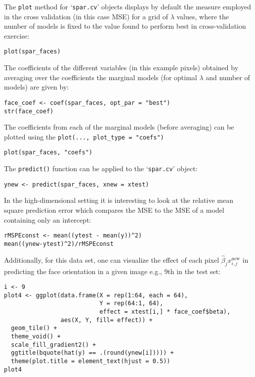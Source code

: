 \documentclass[
  article]{jss}
\begin{document}
The \texttt{plot} method for `\texttt{spar.cv}' objects displays by
default the measure employed in the cross validation (in this case MSE)
for a grid of \(\lambda\) values, where the number of models is fixed to
the value found to perform best in cross-validation exercise:

\begin{verbatim}
plot(spar_faces)
\end{verbatim}

The coefficients of the different variables (in this example pixels)
obtained by averaging over the coefficients the marginal models (for
optimal \(\lambda\) and number of models) are given by:

\begin{verbatim}
face_coef <- coef(spar_faces, opt_par = "best")
str(face_coef)
\end{verbatim}

The coefficients from each of the marginal models (before averaging) can
be plotted using the \texttt{plot(...,\ plot\_type\ =\ "coefs")}

\begin{verbatim}
plot(spar_faces, "coefs")
\end{verbatim}

The \texttt{predict()} function can be applied to the `\texttt{spar.cv}'
object:

\begin{verbatim}
ynew <- predict(spar_faces, xnew = xtest)
\end{verbatim}

In the high-dimensional setting it is interesting to look at the
relative mean square prediction error which compares the MSE to the MSE
of a model containing only an intercept:

\begin{verbatim}
rMSPEconst <- mean((ytest - mean(y))^2) 
mean((ynew-ytest)^2)/rMSPEconst
\end{verbatim}

Additionally, for this data set, one can visualize the effect of each
pixel \(\hat\beta_j x^\text{new}_{i,j}\) in predicting the face
orientation in a given image e.g., 9th in the test set:

\begin{verbatim}
i <- 9
plot4 <- ggplot(data.frame(X = rep(1:64, each = 64),
                           Y = rep(64:1, 64),
                           effect = xtest[i,] * face_coef$beta), 
                aes(X, Y, fill= effect)) +
  geom_tile() +
  theme_void() +
  scale_fill_gradient2() +
  ggtitle(bquote(hat(y) == .(round(ynew[i])))) +
  theme(plot.title = element_text(hjust = 0.5)) 
plot4
\end{verbatim}
\end{document}
